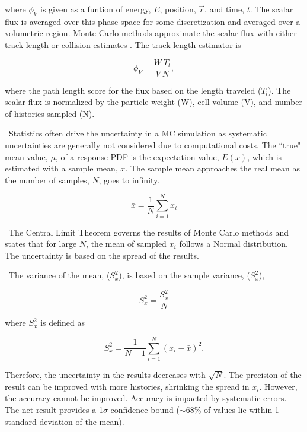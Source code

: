 \noindent where  $\bar{\phi_V}$ is given as a funtion of energy, $E$, position, $\vec{r}$, and time, $t$. The scalar flux is averaged over this phase space for some discretization and averaged over a volumetric region. Monte Carlo methods approximate the scalar flux with either track length or collision estimates \cite{Lewis1984}. The track length estimator is 

\begin{equation} \label{eq:track}
\bar{\phi_V}  = \frac{W \: T_l}{V \: N},
\end{equation}

\noindent where the path length score for the flux based on the length traveled ($T_{l}$). The scalar flux is normalized by the particle weight (W), cell volume (V), and number of histories sampled (N).

\ Statistics often drive the uncertainty in a MC simulation as systematic uncertainties are generally not considered due to computational costs. 
The ``true" mean value, $\mu$, of a response PDF is the expectation value, $E(x)$, which is estimated with a sample mean, $\bar{x}$. 
The sample mean approaches the real mean as the number of samples, $N$, goes to infinity. 

\begin{equation} \label{eq:sampmean}
\bar{x} = \frac{1}{N}\sum_{i=1}^N x_i 
\end{equation}

\ The Central Limit Theorem governs the results of Monte Carlo methods and states that for large $N$, the mean of sampled $x_i$ follows a Normal distribution. 
The uncertainty is based on the spread of the results. 

\ The variance of the mean, ($S_{\bar{x}}^2$), is based on the sample variance, ($S_x^2$), 

\begin{equation} \label{eq:sampvar}
S_{\bar{x}}^2 = \frac{S_x^2}{N}
\end{equation}

\noindent where $S_x^2$ is defined as 

\begin{equation} \label{eq:sampvar1}
S_x^2 = \frac{1}{N-1}\sum_{i=1}^N (x_i - \bar{x})^2.
\end{equation}

Therefore, the uncertainty in the results decreases with $\sqrt{N}$. 
The precision of the result can be improved with more histories, shrinking the spread in $x_i$. 
However, the accuracy cannot be improved. 
Accuracy is impacted by systematic errors. 
The net result provides a 1$\sigma$ confidence bound ($\sim$68\% of values lie within 1 standard deviation of the mean). 

